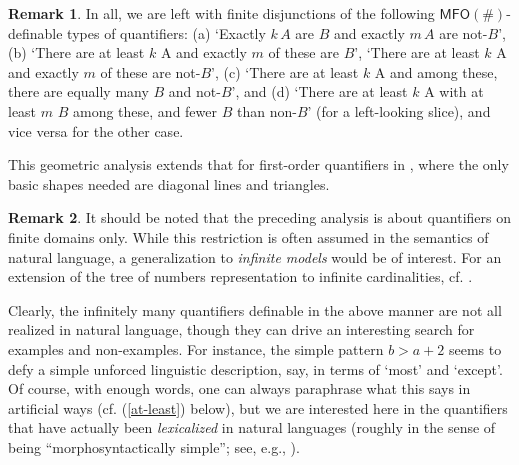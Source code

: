\documentclass[12pt,oneside,reqno]{amsart}
\theoremstyle{definition}
\newtheorem{remark}{Remark}
\begin{document}
\begin{remark}
In all, we are left with finite disjunctions of the following $\mathsf{MFO}(\#)$-definable types of quantifiers: (a) `Exactly $k\, A$ are $B$ and exactly $m \,A$ are  not-$B$', (b) `There are at least $k$ A and exactly $m$ of these are $B$', `There are at least $k$ A and exactly $m$ of these are not-$B$', (c) `There are at least $k$ A and among these, there are equally many  $B$ and not-$B$', and (d) `There are at least $k$ A with at least $m$ $B$ among these, and fewer $B$ than non-$B$' (for a left-looking slice), and vice versa for the other case.


This geometric analysis extends that  for first-order quantifiers in \cite{vanBenthem1985}, where the only basic shapes needed are diagonal lines and triangles.

\end{remark}

\begin{remark} It should be noted that the preceding analysis is about quantifiers on finite domains only. While this restriction is often assumed in the semantics of natural language, a generalization to \emph{infinite models} would be of interest. For an extension of the tree of numbers representation to infinite cardinalities, cf. \cite{vanDeemter}.\end{remark}


Clearly, the infinitely many quantifiers definable in the above manner are not all realized in natural language, though they can drive an interesting search for examples and non-examples. For instance, the simple pattern $b > a +2$ seems to defy a simple unforced linguistic description, say, in terms of `most' and `except'. Of course, with enough words, one can always paraphrase what this says in artificial ways (cf. (\ref{at-least}) below), but we are interested here in the quantifiers that have actually been \emph{lexicalized} in natural languages (roughly in the sense of being ``morphosyntactically simple''; see, e.g.,  \citealt{KeenanPaperno}).
\end{document}
